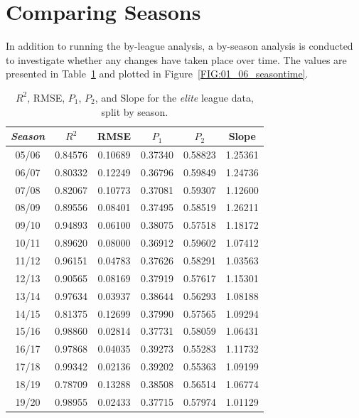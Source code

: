\documentclass[a4paper,10pt]{report}
\begin{document}
\section{Comparing Seasons}\label{sec:comparingseasons}
In addition to running the by-league analysis, a by-season analysis is conducted to investigate whether any changes have taken place over time. The values are presented in Table~\ref{tab:seasonvalues} and plotted in Figure~\ref{FIG:01_06_seasontime}.

\begin{table}[h!]\begin{center}\begin{tabular}{c||c|c|c|c|c}
\textit{Season}&$R^2$  &RMSE	   &$P_1$ 	&$P_2$ & Slope \\ \hline \hline
05/06& 0.84576& 0.10689& 0.37340& 0.58823 &1.25361\\
06/07& 0.80332& 0.12249& 0.36796& 0.59849 &1.24736\\
07/08& 0.82067& 0.10773& 0.37081& 0.59307 &1.12600\\
08/09& 0.89556& 0.08401& 0.37495& 0.58519 &1.26211\\
09/10& 0.94893& 0.06100& 0.38075& 0.57518 &1.18172\\
10/11& 0.89620& 0.08000& 0.36912& 0.59602 &1.07412\\
11/12& 0.96151& 0.04783& 0.37626& 0.58291 &1.03563\\
12/13& 0.90565& 0.08169& 0.37919& 0.57617 &1.15301\\
13/14& 0.97634& 0.03937& 0.38644& 0.56293 &1.08188\\
14/15& 0.81375& 0.12699& 0.37990& 0.57565 &1.09294\\
15/16& 0.98860& 0.02814& 0.37731& 0.58059 &1.06431\\
16/17& 0.97868& 0.04035& 0.39273& 0.55283 &1.11732\\
17/18& 0.99342& 0.02136& 0.39202& 0.55363 &1.09199\\
18/19& 0.78709& 0.13288& 0.38508& 0.56514 &1.06774\\
19/20& 0.98955& 0.02433& 0.37715& 0.57974 &1.01129

\end{tabular}\end{center}\caption{$R^2$, RMSE, $P_1$, $P_2$, and Slope for the \textit{elite} league data, split by season.}\label{tab:seasonvalues}
\end{table}
\end{document}
